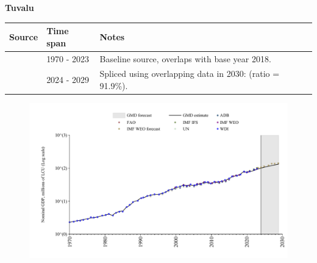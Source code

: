 \documentclass[12pt,a4paper,landscape]{article}
\begin{document}
\begin{adjustbox}{max totalsize={\paperwidth}{\paperheight},center}
\begin{minipage}[t][\textheight][t]{\textwidth}
\vspace*{0.5cm}
{}
\begin{center}
{\Large\bfseries Tuvalu}
\end{center}
\vspace{0.5cm}
\begin{table}[H]
\centering
\small
\begin{tabular}{|l|l|l|}
\hline
\textbf{Source} & \textbf{Time span} & \textbf{Notes} \\
\hline
\rowcolor{white}\cite{WDI}& 1970 - 2023 &Baseline source, overlaps with base year 2018.\\
\rowcolor{lightgray}\cite{IMF_WEO_forecast}& 2024 - 2029 &Spliced using overlapping data in 2030: (ratio = 91.9\%).\\
\hline
\end{tabular}
\end{table}
\begin{figure}[H]
\centering
\includegraphics[width=\textwidth,height=0.6\textheight,keepaspectratio]{graphs/TUV_nGDP.pdf}
\end{figure}
\end{minipage}
\end{adjustbox}
\end{document}
